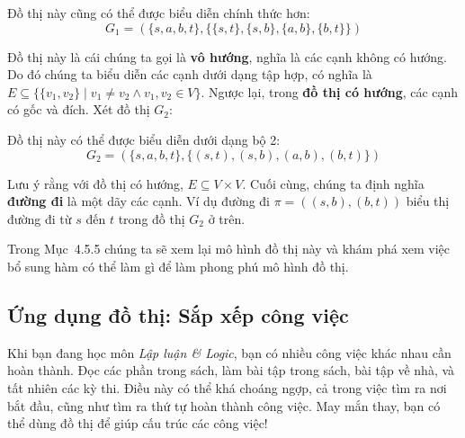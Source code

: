\begin{center}
\end{center}

Đồ thị này cũng có thể được biểu diễn chính thức hơn:
\[
G_1 = (\{s, a, b, t\}, \{\{s, t\}, \{s, b\}, \{a, b\}, \{b, t\}\})
\]

Đồ thị này là cái chúng ta gọi là \textbf{vô hướng}, nghĩa là các cạnh không có hướng. Do đó chúng ta biểu diễn các cạnh dưới dạng tập hợp, có nghĩa là $E \subseteq \{\{v_1, v_2\} \mid v_1 \neq v_2 \land v_1, v_2 \in V\}$. Ngược lại, trong \textbf{đồ thị có hướng}, các cạnh có gốc và đích. Xét đồ thị $G_2$:

\begin{center}
\end{center}

Đồ thị này có thể được biểu diễn dưới dạng bộ 2:
\[
G_2 = (\{s, a, b, t\}, \{(s, t), (s, b), (a, b), (b, t)\})
\]

Lưu ý rằng với đồ thị có hướng, $E \subseteq V \times V$. Cuối cùng, chúng ta định nghĩa \textbf{đường đi} là một dãy các cạnh. Ví dụ đường đi $\pi = ((s, b), (b, t))$ biểu thị đường đi từ $s$ đến $t$ trong đồ thị $G_2$ ở trên.

Trong Mục~4.5.5 chúng ta sẽ xem lại mô hình đồ thị này và khám phá xem việc bổ sung hàm có thể làm gì để làm phong phú mô hình đồ thị.

\subsection{Ứng dụng đồ thị: Sắp xếp công việc}

Khi bạn đang học môn \textit{Lập luận \& Logic}, bạn có nhiều công việc khác nhau cần hoàn thành. Đọc các phần trong sách, làm bài tập trong sách, bài tập về nhà, và tất nhiên các kỳ thi. Điều này có thể khá choáng ngợp, cả trong việc tìm ra nơi bắt đầu, cũng như tìm ra thứ tự hoàn thành công việc. May mắn thay, bạn có thể dùng đồ thị để giúp cấu trúc các công việc!

